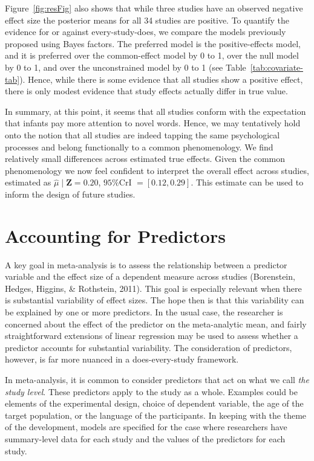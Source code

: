 \documentclass[english,,man]{apa6}
\begin{document}
Figure~\ref{fig:resFig} also shows that while three studies have an observed negative effect size the posterior means for all 34 studies are positive. To quantify the evidence for or against every-study-does, we compare the models previously proposed using Bayes factors. The preferred model is the positive-effects model, and it is preferred over the common-effect model by 0 to 1, over the null model by 0 to 1, and over the unconstrained model by 0 to 1 (see Table~\ref{tab:covariate-tab}). Hence, while there is some evidence that all studies show a positive effect, there is only modest evidence that study effects actually differ in true value.

In summary, at this point, it seems that all studies conform with the expectation that infants pay more attention to novel words. Hence, we may tentatively hold onto the notion that all studies are indeed tapping the same psychological processes and belong functionally to a common phenomenology. We find relatively small differences across estimated true effects. Given the common phenomenology we now feel confident to interpret the overall effect across studies, estimated as \(\hat{\mu} \mid \bm Z= 0.20\), \(95\%\)CrI \(= [0.12, 0.29]\). This estimate can be used to inform the design of future studies.

\hypertarget{accounting-for-predictors}{%
\section{Accounting for Predictors}\label{accounting-for-predictors}}

A key goal in meta-analysis is to assess the relationship between a predictor variable and the effect size of a dependent measure across studies (Borenstein, Hedges, Higgins, \& Rothstein, 2011). This goal is especially relevant when there is substantial variability of effect sizes. The hope then is that this variability can be explained by one or more predictors. In the usual case, the researcher is concerned about the effect of the predictor on the meta-analytic mean, and fairly straightforward extensions of linear regression may be used to assess whether a predictor accounts for substantial variability. The consideration of predictors, however, is far more nuanced in a does-every-study framework.

In meta-analysis, it is common to consider predictors that act on what we call \emph{the study level}. These predictors apply to the study as a whole. Examples could be elements of the experimental design, choice of dependent variable, the age of the target population, or the language of the participants. In keeping with the theme of the development, models are specified for the case where researchers have summary-level data for each study and the values of the predictors for each study.
\end{document}
